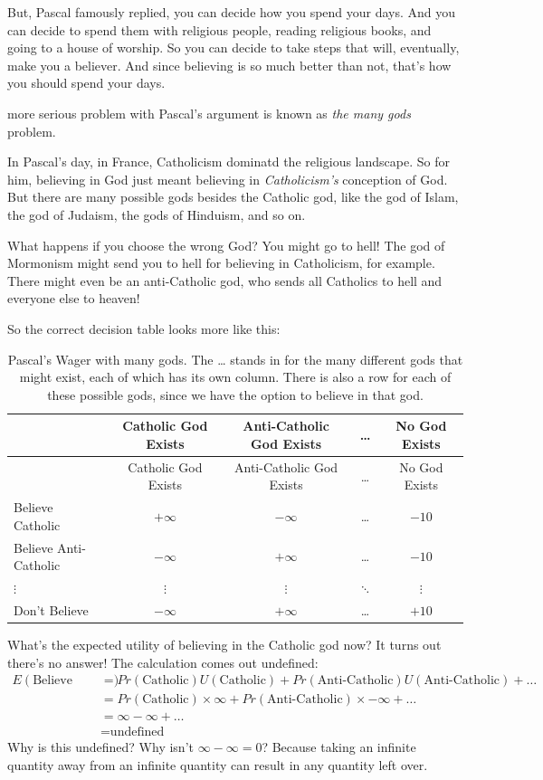 \documentclass[justified]{tufte-book}
\renewcommand{\u}{U}
\newcommand{\p}{Pr}
\newcommand{\E}{E}
\theoremstyle{definition}
\theoremstyle{definition}
\theoremstyle{definition}
\theoremstyle{remark}
\begin{document}
But, Pascal famously replied, you can decide how you spend your days.
And you can decide to spend them with religious people, reading
religious books, and going to a house of worship. So you can decide to
take steps that will, eventually, make you a believer. And since
believing is so much better than not, that's how you should spend your
days.

 more serious problem with Pascal's argument is known as
\emph{the many gods} problem.

In Pascal's day, in France, Catholicism dominatd the religious
landscape. So for him, believing in God just meant believing in
\emph{Catholicism's} conception of God. But there are many possible gods
besides the Catholic god, like the god of Islam, the god of Judaism, the
gods of Hinduism, and so on.

What happens if you choose the wrong God? You might go to hell! The god
of Mormonism might send you to hell for believing in Catholicism, for
example. There might even be an anti-Catholic god, who sends all
Catholics to hell and everyone else to heaven!

So the correct decision table looks more like this:

\begin{longtable}[]{@{}lcccc@{}}
\caption{\label{tab:manygods}Pascal's Wager with many gods. The \ldots{}
stands in for the many different gods that might exist, each of which
has its own column. There is also a row for each of these possible gods,
since we have the option to believe in that god.}\tabularnewline
\toprule
& Catholic God Exists & Anti-Catholic God Exists & \ldots{} & No God
Exists\tabularnewline
\midrule
\endfirsthead
\toprule
& Catholic God Exists & Anti-Catholic God Exists & \ldots{} & No God
Exists\tabularnewline
\midrule
\endhead
Believe Catholic & \(+\infty\) & \(-\infty\) & \ldots{} &
\(-10\)\tabularnewline
Believe Anti-Catholic & \(-\infty\) & \(+\infty\) & \ldots{} &
\(-10\)\tabularnewline
\(\vdots\) & \(\vdots\) & \(\vdots\) & \(\ddots\) &
\(\vdots\)\tabularnewline
Don't Believe & \(-\infty\) & \(+\infty\) & \ldots{} &
\(+10\)\tabularnewline
\bottomrule
\end{longtable}

What's the expected utility of believing in the Catholic god now? It
turns out there's no answer! The calculation comes out undefined: \[
  \begin{aligned}
  \E(\mbox{Believe Catholic}) %
    &= \p(\mbox{Catholic})\u(\mbox{Catholic}) +%
       \p(\mbox{Anti-Catholic})\u(\mbox{Anti-Catholic}) + \ldots\\
    &= \p(\mbox{Catholic}) \times \infty + \p(\mbox{Anti-Catholic}) \times%
        -\infty + \ldots\\
    &= \infty - \infty + \ldots\\
    &= \mbox{undefined}
  \end{aligned}
\] Why is this undefined? Why isn't \(\infty - \infty = 0\)? Because
taking an infinite quantity away from an infinite quantity can result in
any quantity left over.
\end{document}
